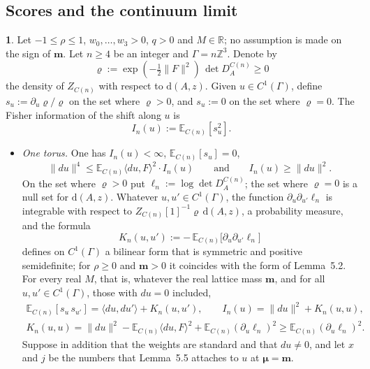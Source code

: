 \documentclass[11pt]{amsart}
\newcommand{\namedhead}{}
\theoremstyle{definition}
\newtheorem*{namedinner}{\namedhead}
\newenvironment{named}[1]{\renewcommand{\namedhead}{#1}\begin{namedinner}}{\end{namedinner}}
\begin{document}
\subsection{Scores and the continuum limit}
\begin{named}{Proposition 5.6}
Let $-1\le\rho\le1$, $w_0,\dots,w_3>0$, $q>0$ and $M\in\mathbb R$; no assumption is made on the sign of $\mathbf m$.
Let $n\ge4$ be an integer and $\Gamma=n\mathbb Z^3$.
Denote by
\begin{equation*}
\varrho:=\exp(-\tfrac12\|F\|^2)\,\det D^{C(n)}_A\ge0
\end{equation*}
the density of $Z_{C(n)}$ with respect to $\mathrm d(A,z)$.
Given $u\in C^1(\Gamma)$, define $s_u:=\partial_u\varrho/\varrho$ on the set where $\varrho>0$, and $s_u:=0$ on the set where $\varrho=0$.
The Fisher information of the shift along $u$ is
\begin{equation*}
I_n(u):=\mathbb E_{C(n)}[s_u^2].
\end{equation*}
\begin{itemize}
\item[(a)] \emph{One torus.}
One has $I_n(u)<\infty$, $\mathbb E_{C(n)}[s_u]=0$,
\begin{equation*}
\|du\|^4\le\mathbb E_{C(n)}\langle du,F\rangle^2\cdot I_n(u)\qquad\text{and}\qquad I_n(u)\ge\|du\|^2.
\end{equation*}
On the set where $\varrho>0$ put $\ell_n:=\log\det D^{C(n)}_A$; the set where $\varrho=0$ is a null set for $\mathrm d(A,z)$.
Whatever $u,u'\in C^1(\Gamma)$, the function $\partial_u\partial_{u'}\ell_n$ is integrable with respect to $Z_{C(n)}[1]^{-1}\varrho\,\mathrm d(A,z)$, a probability measure, and the formula
\begin{equation*}
K_n(u,u'):=-\,\mathbb E_{C(n)}\bigl[\partial_u\partial_{u'}\ell_n\bigr]
\end{equation*}
defines on $C^1(\Gamma)$ a bilinear form that is symmetric and positive semidefinite; for $\rho\ge0$ and $\mathbf m>0$ it coincides with the form of Lemma~5.2.
For every real $M$, that is, whatever the real lattice mass $\mathbf m$, and for all $u,u'\in C^1(\Gamma)$, those with $du=0$ included,
\begin{gather*}
\mathbb E_{C(n)}[s_u\,s_{u'}]=\langle du,du'\rangle+K_n(u,u'),\qquad I_n(u)=\|du\|^2+K_n(u,u),\\
K_n(u,u)=\|du\|^2-\mathbb E_{C(n)}\langle du,F\rangle^2+\mathbb E_{C(n)}(\partial_u\ell_n)^2\ge\mathbb E_{C(n)}(\partial_u\ell_n)^2.
\end{gather*}
Suppose in addition that the weights are standard and that $du\ne0$, and let $x$ and $j$ be the numbers that Lemma~5.5 attaches to $u$ at $\boldsymbol\mu=\mathbf m$.

\end{itemize}
\end{named}
\end{document}
